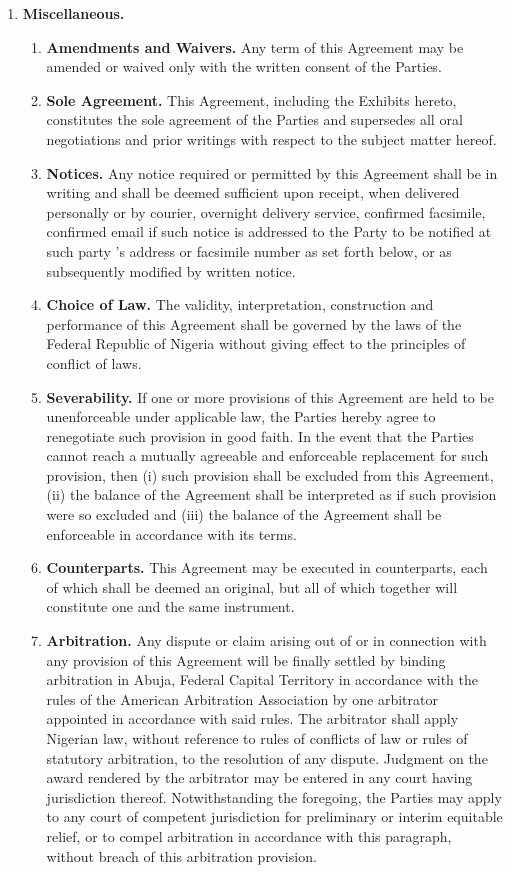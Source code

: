 \documentclass[a4paper,10pt,notitlepage,twocolumn]{article}
\begin{document}
\begin{enumerate}
\item \textbf{Miscellaneous.}
\begin{enumerate}
	\item \textbf{Amendments and Waivers.}  Any term of this Agreement may be amended or waived only with the written consent of the Parties.
	
	\item \textbf{Sole Agreement.}  This Agreement, including the Exhibits hereto, constitutes the sole agreement of the Parties and supersedes all oral negotiations and prior writings with respect to the subject matter hereof.
	
	\item \textbf{Notices.}  Any notice required or permitted by this Agreement shall be in writing and shall be deemed sufficient upon receipt, when delivered personally or by courier, overnight delivery service, confirmed facsimile, confirmed email if such notice is addressed to the Party to be notified at such party 's address or facsimile number as set forth below, or as subsequently modified by written notice.
	
	\item \textbf{Choice of Law. } The validity, interpretation, construction and performance of this Agreement shall be governed by the laws of the Federal Republic of Nigeria without giving effect to the principles of conflict of laws.
	
	\item \textbf{Severability.}  If one or more provisions of this Agreement are held to be unenforceable under applicable law, the Parties hereby agree to renegotiate such provision in good faith.  In the event that the Parties cannot reach a mutually agreeable and enforceable replacement for such provision, then (i) such provision shall be excluded from this Agreement, (ii) the balance of the Agreement shall be interpreted as if such provision were so excluded and (iii) the balance of the Agreement shall be enforceable in accordance with its terms.
	
	\item \textbf{Counterparts.}  This Agreement may be executed in counterparts, each of which shall be deemed an original, but all of which together will constitute one and the same instrument.
	
	\item \textbf{Arbitration.}   Any dispute or claim arising out of or in connection with any provision of this Agreement will be finally settled by binding arbitration in Abuja, Federal Capital Territory in accordance with the rules of the American Arbitration Association by one arbitrator appointed in accordance with said rules.  The arbitrator shall apply Nigerian law, without reference to rules of conflicts of law or rules of statutory arbitration, to the resolution of any dispute.  Judgment on the award rendered by the arbitrator may be entered in any court having jurisdiction thereof.  Notwithstanding the foregoing, the Parties may apply to any court of competent jurisdiction for preliminary or interim equitable relief, or to compel arbitration in accordance with this paragraph, without breach of this arbitration provision.
	

\end{enumerate}
\end{enumerate}
\end{document}
